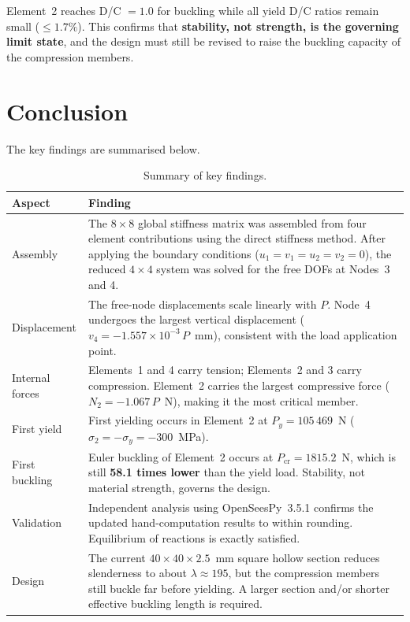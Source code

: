 \documentclass[11pt, a4paper]{article}
\begin{document}
\noindent Element~2 reaches D/C $= 1.0$ for buckling while all yield D/C ratios remain small ($\le 1.7\%$).  This confirms that \textbf{stability, not strength, is the governing limit state}, and the design must still be revised to raise the buckling capacity of the compression members.

\section{Conclusion}

The key findings are summarised below.

\begin{table}[H]
\centering
\small
\renewcommand{\arraystretch}{1.25}
\begin{tabular}{@{}lp{10cm}@{}}
\toprule
\textbf{Aspect} & \textbf{Finding} \\
\midrule
Assembly &
The $8\!\times\!8$ global stiffness matrix was assembled from four element contributions using the direct stiffness method.  After applying the boundary conditions ($u_1=v_1=u_2=v_2=0$), the reduced $4\!\times\!4$ system was solved for the free DOFs at Nodes~3 and 4. \\[3pt]
Displacement &
The free-node displacements scale linearly with $P$.  Node~4 undergoes the largest vertical displacement ($v_4 = -1.557\!\times\!10^{-3}\,P$~mm), consistent with the load application point. \\[3pt]
Internal forces &
Elements~1 and 4 carry tension; Elements~2 and 3 carry compression.  Element~2 carries the largest compressive force ($N_2 = -1.067\,P$~N), making it the most critical member. \\[3pt]
First yield &
First yielding occurs in Element~2 at $P_y = 105\,469$~N ($\sigma_2 = -\sigma_y = -300$~MPa). \\[3pt]
First buckling &
Euler buckling of Element~2 occurs at $P_{\text{cr}} = 1815.2$~N, which is still \textbf{58.1 times lower} than the yield load.  Stability, not material strength, governs the design. \\[3pt]
Validation &
Independent analysis using OpenSeesPy~3.5.1 confirms the updated hand-computation results to within rounding.  Equilibrium of reactions is exactly satisfied. \\[3pt]
Design &
The current $40\!\times\!40\!\times\!2.5$~mm square hollow section reduces slenderness to about $\lambda\approx195$, but the compression members still buckle far before yielding.  A larger section and/or shorter effective buckling length is required. \\
\bottomrule
\end{tabular}
\caption{Summary of key findings.}
\label{tab:conclusion}
\end{table}
\end{document}

